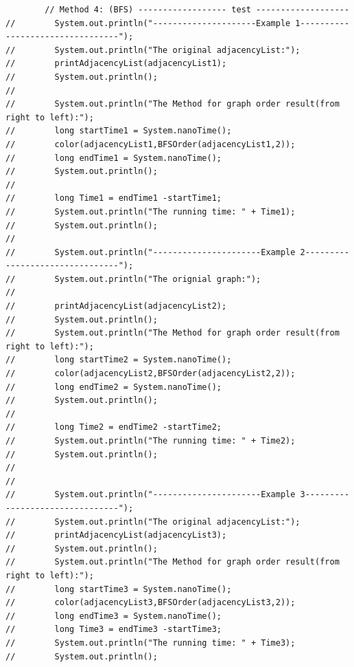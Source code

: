 \documentclass{article}
\begin{document}
\begin{verbatim}
        // Method 4: (BFS) ------------------ test -------------------
//        System.out.println("---------------------Example 1---------------------------------");
//        System.out.println("The original adjacencyList:");
//        printAdjacencyList(adjacencyList1);
//        System.out.println();
//
//        System.out.println("The Method for graph order result(from right to left):");
//        long startTime1 = System.nanoTime();
//        color(adjacencyList1,BFSOrder(adjacencyList1,2));
//        long endTime1 = System.nanoTime();
//        System.out.println();
//
//        long Time1 = endTime1 -startTime1;
//        System.out.println("The running time: " + Time1);
//        System.out.println();
//
//        System.out.println("----------------------Example 2--------------------------------");
//        System.out.println("The orignial graph:");
//
//        printAdjacencyList(adjacencyList2);
//        System.out.println();
//        System.out.println("The Method for graph order result(from right to left):");
//        long startTime2 = System.nanoTime();
//        color(adjacencyList2,BFSOrder(adjacencyList2,2));
//        long endTime2 = System.nanoTime();
//        System.out.println();
//
//        long Time2 = endTime2 -startTime2;
//        System.out.println("The running time: " + Time2);
//        System.out.println();
//
//
//        System.out.println("----------------------Example 3--------------------------------");
//        System.out.println("The original adjacencyList:");
//        printAdjacencyList(adjacencyList3);
//        System.out.println();
//        System.out.println("The Method for graph order result(from right to left):");
//        long startTime3 = System.nanoTime();
//        color(adjacencyList3,BFSOrder(adjacencyList3,2));
//        long endTime3 = System.nanoTime();
//        long Time3 = endTime3 -startTime3;
//        System.out.println("The running time: " + Time3);
//        System.out.println();



\end{verbatim}
\end{document}
